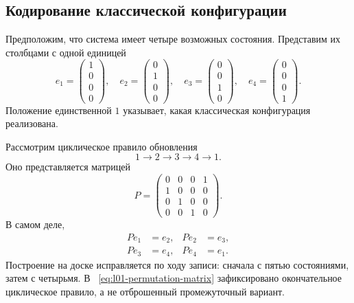 \subsection{Кодирование классической конфигурации}

Предположим, что система имеет четыре возможных состояния. Представим их столбцами с одной единицей
\begin{equation}
  e_1=
  \begin{pmatrix}1\\0\\0\\0\end{pmatrix},
  \quad
  e_2=
  \begin{pmatrix}0\\1\\0\\0\end{pmatrix},
  \quad
  e_3=
  \begin{pmatrix}0\\0\\1\\0\end{pmatrix},
  \quad
  e_4=
  \begin{pmatrix}0\\0\\0\\1\end{pmatrix}.
  \label{eq:l01-one-hot}
\end{equation}
Положение единственной \(1\) указывает, какая классическая конфигурация реализована.

Рассмотрим циклическое правило обновления
\begin{equation}
  1\longrightarrow2\longrightarrow3\longrightarrow4\longrightarrow1.
  \label{eq:l01-four-cycle}
\end{equation}
Оно представляется матрицей
\begin{equation}
  P=
  \begin{pmatrix}
    0&0&0&1\\
    1&0&0&0\\
    0&1&0&0\\
    0&0&1&0
  \end{pmatrix}.
  \label{eq:l01-permutation-matrix}
\end{equation}
В самом деле,
\begin{equation}
  \begin{aligned}
    Pe_1&=e_2, & Pe_2&=e_3,\\
    Pe_3&=e_4, & Pe_4&=e_1.
  \end{aligned}
\end{equation}
Построение на доске исправляется по ходу записи: сначала с пятью состояниями, затем с четырьмя. В ~\eqref{eq:l01-permutation-matrix} зафиксировано окончательное циклическое правило, а не отброшенный промежуточный вариант.

